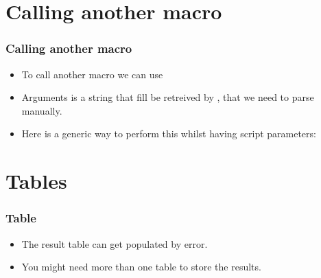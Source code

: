 \section{Calling another macro}

\begin{frame}
  \frametitle<presentation>{Calling another macro}
  \begin{itemize}
  \item To call another macro we can use 
  \item Arguments is a string that fill be retreived by , that
    we need to parse manually.
  \item Here is a generic way to perform this whilst having script parameters:
  \only<article>{}
\end{itemize}
\end{frame}

\section{Tables}
\begin{frame}[fragile]
  \frametitle<presentation>{Table}
  \begin{itemize}
  \item The result table can get populated by error.
  \item You might need more than one table to store the results.
  \end{itemize}
\end{frame}


